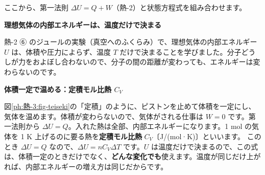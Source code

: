 
\leavevmode\label{ph:熱-3:sec4}ここから、第一法則 $\Delta U=Q+W$（熱-2）と状態方程式を組み合わせます。

\noindent\textbf{理想気体の内部エネルギーは、温度だけで決まる}\par\nobreak
熱-2 ⑥ のジュールの実験（真空へのふくらみ）で、理想気体の内部エネルギー $U$ は、体積や圧力によらず、温度 $T$ だけで決まることを学びました。分子どうしが力をおよぼし合わないので、分子の間の距離が変わっても、エネルギーは変わらないのです。

\noindent\textbf{体積一定で温める：定積モル比熱 $C_V$}\par\nobreak
図\ref{ph:熱-3:fig-teiseki}の「定積」のように、ピストンを止めて体積を一定にし、気体を温めます。体積が変わらないので、気体がされる仕事は $W=0$ です。第一法則から $\Delta U=Q$。入れた熱は全部、内部エネルギーになります。1 mol の気体を 1 K 上げるのに要る熱を\textbf{定積モル比熱} $C_V$〔J/(mol·K)〕といいます。
\label{ph:熱-3:teiseki}このとき $\Delta U=Q$ なので、$\Delta U=nC_V\Delta T$ です。$U$ は温度だけで決まるので、この式は、体積一定のときだけでなく、\textbf{どんな変化でも}使えます。温度が同じだけ上がれば、内部エネルギーの増え方は同じだからです。

